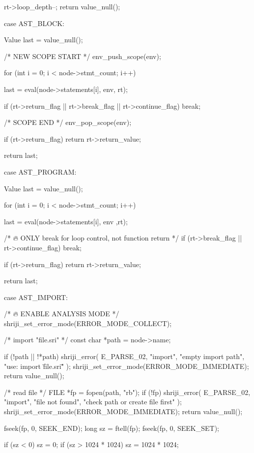 \documentclass{article}
\begin{document}
{{{    rt->loop_depth--;
    return value_null();
}



case AST_BLOCK: {
    Value last = value_null();


    /*  NEW SCOPE START */
    env_push_scope(env);


    for (int i = 0; i < node->stmt_count; i++) {

        last = eval(node->statements[i], env, rt);

        if (rt->return_flag || rt->break_flag || rt->continue_flag)
            break;
    }

    /*  SCOPE END */
    env_pop_scope(env);


    if (rt->return_flag)
        return rt->return_value;

    return last;
}


case AST_PROGRAM: {
    Value last = value_null();


    for (int i = 0; i < node->stmt_count; i++) {

        last = eval(node->statements[i], env ,rt);

/* 🔥 ONLY break for loop control, not function return */
if (rt->break_flag || rt->continue_flag)
    break;
    }

    if (rt->return_flag)
        return rt->return_value;

    return last;
}

case AST_IMPORT: {

    /* 🔥 ENABLE ANALYSIS MODE */
    shriji_set_error_mode(ERROR_MODE_COLLECT);

    /* import "file.sri" */
    const char *path = node->name;

    if (!path || !*path) {
        shriji_error(
            E_PARSE_02,
            "import",
            "empty import path",
            "use: import \"file.sri\""
        );
        shriji_set_error_mode(ERROR_MODE_IMMEDIATE);
        return value_null();
    }

    /* read file */
    FILE *fp = fopen(path, "rb");
    if (!fp) {
        shriji_error(
            E_PARSE_02,
            "import",
            "file not found",
            "check path or create file first"
        );
        shriji_set_error_mode(ERROR_MODE_IMMEDIATE);
        return value_null();
    }

    fseek(fp, 0, SEEK_END);
    long sz = ftell(fp);
    fseek(fp, 0, SEEK_SET);

    if (sz < 0) sz = 0;
    if (sz > 1024 * 1024) sz = 1024 * 1024;

}}}
\end{document}
